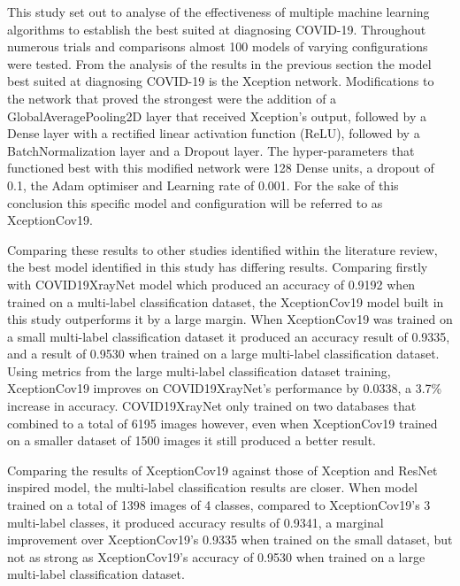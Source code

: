 This study set out to analyse of the effectiveness of multiple machine learning algorithms to establish the best suited at diagnosing COVID-19. Throughout numerous trials and comparisons almost 100 models of varying configurations were tested. From the analysis of the results in the previous section the model best suited at diagnosing COVID-19 is the Xception network. Modifications to the network that proved the strongest were the addition of a GlobalAveragePooling2D layer that received Xception’s output, followed by a Dense layer with a rectified linear activation function (ReLU), followed by a BatchNormalization layer and a Dropout layer. The hyper-parameters that functioned best with this modified network were 128 Dense units, a dropout of 0.1, the Adam optimiser and Learning rate of 0.001. For the sake of this conclusion this specific model and configuration will be referred to as XceptionCov19.

Comparing these results to other studies identified within the literature review, the best model identified in this study has differing results. Comparing firstly with \cite{zhang2020covid19xraynet} COVID19XrayNet model which produced an accuracy of 0.9192 when trained on a multi-label classification dataset, the XceptionCov19 model built in this study outperforms it by a large margin. When XceptionCov19 was trained on a small multi-label classification dataset it produced an accuracy result of 0.9335, and a result of 0.9530 when trained on a large multi-label classification dataset. Using metrics from the large multi-label classification dataset training, XceptionCov19 improves on COVID19XrayNet's performance by 0.0338, a 3.7\% increase in accuracy. COVID19XrayNet only trained on two databases that combined to a total of 6195 images however, even when XceptionCov19 trained on a smaller dataset of 1500 images it still produced a better result.

Comparing the results of XceptionCov19 against those of \cite{fitriasari2021improvement} Xception and ResNet inspired model, the multi-label classification results are closer. When \cite{fitriasari2021improvement} model trained on a total of 1398 images of 4 classes, compared to XceptionCov19's 3 multi-label classes, it produced accuracy results of 0.9341, a marginal improvement over XceptionCov19's 0.9335 when trained on the small dataset, but not as strong as XceptionCov19's accuracy of 0.9530 when trained on a large multi-label classification dataset.

